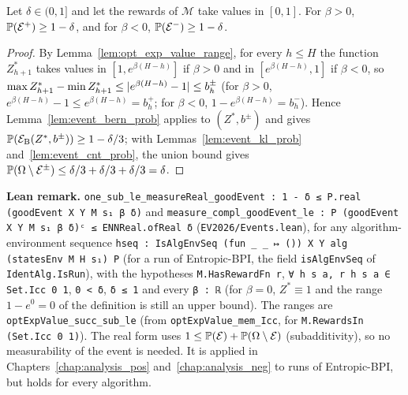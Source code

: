 \begin{lemma}\label{lem:good_event}
\leanok
{}
Let $\delta \in (0, 1]$ and let the rewards of $\mathcal M$ take values in $[0, 1]$. For $\beta > 0$,
$\mathbb{P}(\mathcal{E}^+) \ge 1 - \delta$, and for $\beta < 0$, $\mathbb{P}(\mathcal{E}^-) \ge 1 - \delta$.
\end{lemma}

\begin{proof}
\leanok
By Lemma~\ref{lem:opt_exp_value_range}, for every $h \le H$ the function $Z^*_{h+1}$ takes values
in $[1, e^{\beta(H - h)}]$ if $\beta > 0$ and in $[e^{\beta(H - h)}, 1]$ if $\beta < 0$, so
$\max Z^*_{h+1} - \min Z^*_{h+1} \le \lvert e^{\beta(H - h)} - 1 \rvert \le b^\pm_h$ (for $\beta > 0$,
$e^{\beta(H-h)} - 1 \le e^{\beta(H - h)} = b^+_h$; for $\beta < 0$, $1 - e^{\beta(H-h)} = b^-_h$). Hence
Lemma~\ref{lem:event_bern_prob} applies to $(Z^*, b^\pm)$ and gives
$\mathbb{P}(\mathcal{E}_{\mathrm{B}}(Z^*, b^\pm)) \ge 1 - \delta/3$; with Lemmas~\ref{lem:event_kl_prob}
and~\ref{lem:event_cnt_prob}, the union bound gives
$\mathbb{P}(\Omega \setminus \mathcal{E}^\pm) \le \delta/3 + \delta/3 + \delta/3 = \delta$.
\end{proof}

\textbf{Lean remark.} \texttt{one\_sub\_le\_measureReal\_goodEvent : 1 - δ ≤ P.real (goodEvent X Y M s₁ β δ)}
and \texttt{measure\_compl\_goodEvent\_le : P (goodEvent X Y M s₁ β δ)ᶜ ≤ ENNReal.ofReal δ}
(\texttt{EV2026/Events.lean}), for any algorithm-environment sequence
\texttt{hseq : IsAlgEnvSeq (fun \_ \_ ↦ ()) X Y alg (statesEnv M H s₁) P} (for a run of Entropic-BPI,
the field \texttt{isAlgEnvSeq} of \texttt{IdentAlg.IsRun}), with the hypotheses
\texttt{M.HasRewardFn r}, \texttt{∀ h s a, r h s a ∈ Set.Icc 0 1}, \texttt{0 < δ}, \texttt{δ ≤ 1} and
every \texttt{β : ℝ} (for $\beta = 0$, $Z^* \equiv 1$ and the range $1 - e^0 = 0$ of the definition is
still an upper bound). The ranges are \texttt{optExpValue\_succ\_sub\_le} (from
\texttt{optExpValue\_mem\_Icc}, for \texttt{M.RewardsIn (Set.Icc 0 1)}). The real form uses
$1 \le \mathbb{P}(\mathcal{E}) + \mathbb{P}(\Omega \setminus \mathcal{E})$ (subadditivity), so no measurability of
the event is needed. It is applied in Chapters~\ref{chap:analysis_pos}
and~\ref{chap:analysis_neg} to runs of Entropic-BPI, but holds for every algorithm.
